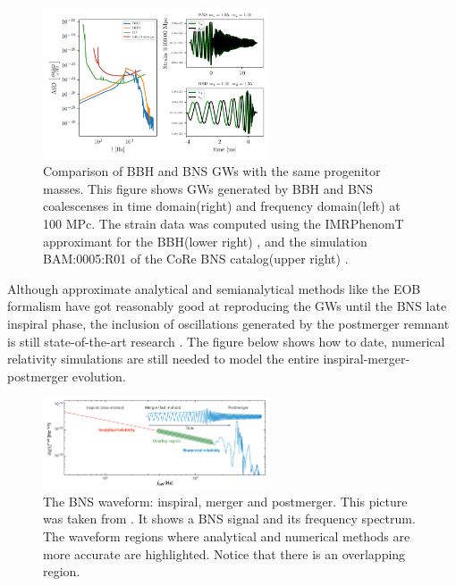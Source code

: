\begin{figure}[hbt!]
\begin{center}
\includegraphics[width=0.6\textwidth, angle=0]{images/Data_analysis/sig_proc/BNS-BBH.pdf}
\captionsetup{width=0.8\textwidth}
\caption[Comparison of BBH and BNS GWs with the same progenitor masses]{Comparison of BBH and BNS GWs with the same progenitor masses. This figure shows GWs generated by BBH and BNS coalescenses in time domain(right) and frequency domain(left) at 100 MPc. The strain data was computed using the IMRPhenomT approximant for the BBH(lower right) \cite{Estelles:2020osj}, and the simulation BAM:0005:R01 of the CoRe BNS catalog(upper right) \cite{Dietrich:2018phi}.}
\label{BBH and BNS}
\end{center}
\end{figure}

\FloatBarrier

Although approximate analytical and semianalytical methods like the EOB formalism \cite{Damour:2012yf,PhysRevD.96.121501,Dietrich:2018uni} have got reasonably good at reproducing the GWs until the BNS late inspiral phase, the inclusion of oscillations generated by the postmerger remnant is still state-of-the-art research \cite{Breschi:2019srl, Tsang:2019esi, Soultanis:2021oia, https://doi.org/10.48550/arxiv.2205.09112}. The figure below shows how to date, numerical relativity simulations are still needed to model the entire inspiral-merger-postmerger evolution.



\begin{figure}[hbt!]
\begin{center}
\includegraphics[width=0.6\textwidth, angle=0]{images/postmerger.png}
\captionsetup{width=0.8\textwidth}
\caption[The BNS waveform: inspiral, merger and postmerger]{The BNS waveform: inspiral, merger and postmerger. This picture was taken from \cite{Radice_2020}. It shows a BNS signal and its frequency spectrum. The waveform regions where analytical and numerical methods are more accurate are highlighted. Notice that there is an overlapping region.}
\label{BBH and BNS2}
\end{center}
\end{figure}

